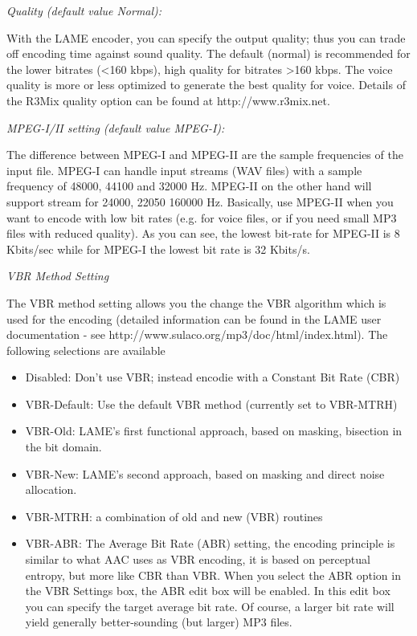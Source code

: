 {\it Quality (default value Normal):}

With the LAME encoder, you can specify the output quality; thus you can trade
off encoding time against sound quality. The default (normal) is recommended for
the lower bitrates (<160 kbps), high quality for bitrates >160 kbps. The voice 
quality is more or less optimized to generate the best quality for voice.
Details of the R3Mix quality option can be found at http://www.r3mix.net.


{\it MPEG-I/II setting (default value MPEG-I):}

The difference between MPEG-I and MPEG-II are the sample frequencies of the input file. MPEG-I can
handle input streams (WAV files) with a sample frequency of 48000, 44100 and 32000 Hz. MPEG-II on the
other hand will support stream for 24000, 22050 160000 Hz. Basically, use MPEG-II when you want to
encode with low bit rates (e.g. for voice files, or if you need small MP3 files with reduced quality).
As you can see, the lowest bit-rate for MPEG-II is 8 Kbits/sec while for MPEG-I the lowest bit rate is
32 Kbits/s.


{\it VBR Method Setting}

The VBR method setting allows you the change the VBR algorithm which is used
for the encoding (detailed information can be found in the LAME user documentation
- see http://www.sulaco.org/mp3/doc/html/index.html). The following selections
are available

\begin{itemize}
\itemsep=0pt
\item Disabled: Don't use VBR; instead encodie with a Constant Bit Rate (CBR)
\item VBR-Default: Use the default VBR method (currently set to VBR-MTRH)
\item VBR-Old: LAME's first functional approach, based on masking, 
bisection in the bit domain.
\item VBR-New: LAME's second approach, based on masking and direct noise 
allocation.
\item VBR-MTRH: a combination of old and new (VBR) routines
\item VBR-ABR: The Average Bit Rate (ABR) setting, the encoding principle is similar to 
what AAC uses as VBR encoding, it is based on perceptual entropy, but more like CBR than VBR. 
When you select the ABR option in the VBR Settings box, the ABR edit box will be enabled. 
In this edit box you can specify the target average bit rate. Of course, a larger bit rate will yield
generally better-sounding (but larger) MP3 files.
\end{itemize}


